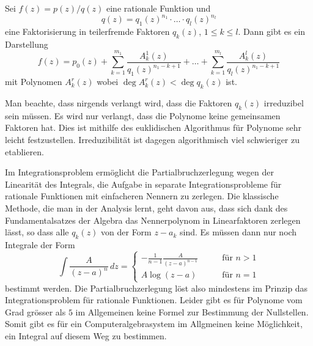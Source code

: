 \begin{satz}[Partialbruchzerlegung]
\label{buch:analytisch:ratioinal:satz:partialbruchzerlegung}
Sei $f(z) = p(z)/q(z)$ eine rationale Funktion und 
\[
q(z)
=
q_1(z)^{n_1}
\cdot\ldots\cdot
q_l(z)^{n_l}
\]
eine Faktorisierung in teilerfremde Faktoren $q_k(z)$, $1\le k\le l$.
Dann gibt es ein Darstellung
\[
f(z)
=
p_0(z)
+
\sum_{k=1}^{m_1}
\frac{A_k^1(z)}{q_1(z)^{n_1-k+1}}
+
\ldots
+
\sum_{k=1}^{m_l}
\frac{A_k^l(z)}{q_l(z)^{n_1-k+1}}
\]
mit Polynomen $A_k^r(z)$
wobei $\deg A_k^r(z) < \deg q_k(z)$ ist.
\end{satz}

Man beachte, dass nirgends verlangt wird, dass die Faktoren 
$q_k(z)$ irreduzibel sein müssen.
Es wird nur verlangt, dass die Polynome keine gemeinsamen
Faktoren hat.
Dies ist mithilfe des euklidischen Algorithmus für Polynome
sehr leicht festzustellen.
Irreduzibilität ist dagegen algorithmisch viel schwieriger
zu etablieren.

Im Integrationsproblem ermöglicht die Partialbruchzerlegung
wegen der Linearität des Integrals, die Aufgabe in separate
Integrationsprobleme für rationale Funktionen mit
einfacheren Nennern zu zerlegen.
Die klassische Methode, die man in der Analysis lernt,
geht davon aus, dass sich dank des Fundamentalsatzes der Algebra
das Nennerpolynom in Linearfaktoren zerlegen lässt, so dass alle
$q_k(z)$ von der Form $z-a_k$ sind.
Es müssen dann nur noch Integrale der Form
\[
\int
\frac{A}{(z-a)^n}
\,dz
=
\begin{cases}
\displaystyle-\frac{1}{n-1} \frac{A}{(z-a)^{n-1}}&\qquad\text{für $n>1$} \\
A\log (z-a)                                      &\qquad\text{für $n=1$}
\end{cases}
\]
bestimmt werden.
Die Partialbruchzerlegung löst also mindestens im Prinzip
das Integrationsproblem für rationale Funktionen.
Leider gibt es für Polynome vom Grad grösser als $5$ im
Allgemeinen keine Formel zur Bestimmung der Nullstellen.
Somit gibt es für ein Computeralgebrasystem im Allgmeinen
keine Möglichkeit, ein Integral auf diesem Weg zu bestimmen.

%
%
